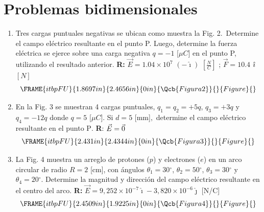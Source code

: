 \documentclass[12pt]{article}
\begin{document}
\section{Problemas bidimensionales}

\begin{enumerate}
\item Tres cargas puntuales negativas se ubican como muestra la Fig. 2.\
Determine el campo el\'{e}ctrico resultante en el punto P. Luego, determine
la fuerza el\'{e}ctrica se ejerce sobre una carga negativa $q=-1$ [$\mu C]$
en el punto P, utilizando el resultado anterior. \textbf{R: }$\vec{E}%
=1.04\times 10^{7}$ $(-\hat{\imath})$ $[\frac{N}{C}]$ ; $\vec{F}=10.4$ $\hat{%
\imath}$ $[N]$%
\begin{equation*}
\FRAME{itbpFU}{1.8697in}{2.4656in}{0in}{\Qcb{Figura 2}}{}{Figure}{\special%
{language "Scientific Word";type "GRAPHIC";maintain-aspect-ratio
TRUE;display "USEDEF";valid_file "T";width 1.8697in;height 2.4656in;depth
0in;original-width 3.4134in;original-height 4.5143in;cropleft "0";croptop
"1";cropright "1";cropbottom "0";tempfilename
'QYQBI40F.wmf';tempfile-properties "XPR";}}
\end{equation*}

\item En la Fig. 3 se muestran 4 cargas puntuales, $q_{1}=q_{2}=+5q$, $%
q_{3}=+3q$ y $q_{4}=-12q$ donde $q=5$ [$\mu C$]. Si $d=5$ [mm]$,$ determine
el campo el\'{e}ctrico resultante en el punto P$.$ \textbf{R}: $\vec{E}=\vec{%
0}$ 
\begin{equation*}
\FRAME{itbpFU}{2.431in}{2.4344in}{0in}{\Qcb{Figura 3}}{}{Figure}{\special%
{language "Scientific Word";type "GRAPHIC";maintain-aspect-ratio
TRUE;display "USEDEF";valid_file "T";width 2.431in;height 2.4344in;depth
0in;original-width 3.8311in;original-height 3.8372in;cropleft "0";croptop
"1";cropright "1";cropbottom "0";tempfilename
'QYQBI40D.wmf';tempfile-properties "XPR";}}
\end{equation*}

\item La Fig. 4 muestra un arreglo de protones ($p$) y electrones ($e$) en
un arco circular de radio $R=2$ [cm], con \'{a}ngulos $\theta _{1}=30%
{{}^\circ}%
$, $\theta _{2}=50%
{{}^\circ}%
$, $\theta _{3}=30%
{{}^\circ}%
$ y $\theta _{4}=20%
{{}^\circ}%
$. Determine la magnitud y direcci\'{o}n del campo el\'{e}ctrico resultante
en el centro del arco. \textbf{R:} $\vec{E}=9,252\times 10^{-7}\hat{\imath}%
-3,820\times 10^{-6}\hat{\jmath}$ [N/C]%
\begin{equation*}
\FRAME{itbpFU}{2.4509in}{1.9225in}{0in}{\Qcb{Figura 4}}{}{Figure}{\special%
{language "Scientific Word";type "GRAPHIC";maintain-aspect-ratio
TRUE;display "USEDEF";valid_file "T";width 2.4509in;height 1.9225in;depth
0in;original-width 5.4587in;original-height 4.2739in;cropleft "0";croptop
"1";cropright "1";cropbottom "0";tempfilename
'QYQBI40E.wmf';tempfile-properties "XPR";}}
\end{equation*}


\end{enumerate}
\end{document}
